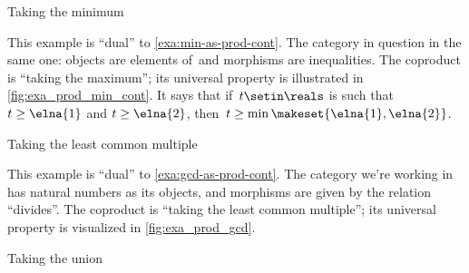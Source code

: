 \begin{figure}[h!
    ]
    \centering
    \caption{}
    \label{fig:coprod_disunion_diagram}
\end{figure}

\begin{marginfigure}
    \centering
    \caption{Taking the minimum}
    \label{fig:exa_coprod_max_cont}
\end{marginfigure}

\begin{example}
    \label{exa:min-as-prod-cont-to-rename}
    This example is ``dual'' to \cref{exa:min-as-prod-cont}.
    The category in question in the same one: objects are elements of~\reals and morphisms are inequalities.
    The coproduct is ``taking the maximum''; its universal property is illustrated in \cref{fig:exa_prod_min_cont}.
    It says that if~$t \setin \reals$ is such that~$t \geq \elna{1}$ and $t \geq \elna{2}$, then~$t \geq \min \makeset{ \elna{1}, \elna{2} }$.

\end{example}

\begin{marginfigure}
    \centering
    \caption{Taking the least common multiple}
    \label{fig:exa_coprod_lcm_cont}
\end{marginfigure}
\begin{example}
    \label{exa:lcm-as-coprod-cont}
    This example is ``dual'' to \cref{exa:gcd-as-prod-cont}.
    The category we're working in has natural numbers as its objects, and morphisms are given by the relation ``divides''.
    The coproduct is ``taking the least common multiple''; its universal property is visualized in \cref{fig:exa_prod_gcd}.
\end{example}

\begin{marginfigure}
    \centering
    \caption{Taking the union}
    \label{fig:exa_coprod_union_cont}
\end{marginfigure}

